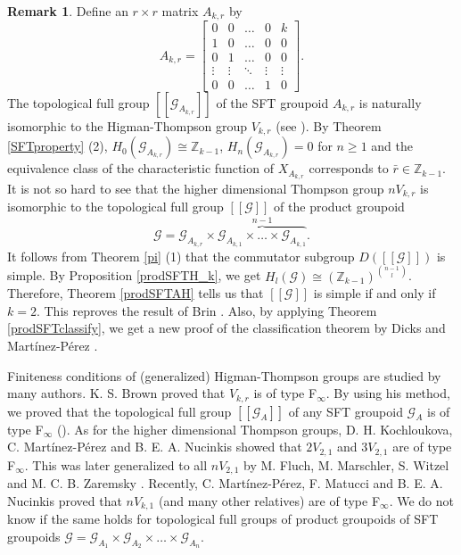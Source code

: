 \documentclass[11pt]{article}
\theoremstyle{definition}
\newtheorem{remark}[theorem]{Remark}
\numberwithin{equation}{section}
\newcommand{\G}{\mathcal{G}}
\newcommand{\Z}{\mathbb{Z}}
\begin{document}
\begin{remark}
Define an $r\times r$ matrix $A_{k,r}$ by 
\[
A_{k,r}=\begin{bmatrix}0&0&\ldots&0&k\\1&0&\ldots&0&0\\0&1&\ldots&0&0\\
\vdots&\vdots&\ddots&\vdots&\vdots\\0&0&\ldots&1&0\end{bmatrix}. 
\]
The topological full group $[[\G_{A_{k,r}}]]$ of the SFT groupoid $A_{k,r}$ 
is naturally isomorphic to the Higman-Thompson group $V_{k,r}$ 
(see \cite[Section 6.7.1]{M15crelle}). 
By Theorem \ref{SFTproperty} (2), 
$H_0(\G_{A_{k,r}})\cong\Z_{k{-}1}$, $H_n(\G_{A_{k,r}})=0$ for $n\geq1$ and 
the equivalence class of the characteristic function of $X_{A_{k,r}}$ 
corresponds to $\bar{r}\in\Z_{k{-}1}$. 
It is not so hard to see that 
the higher dimensional Thompson group $nV_{k,r}$ is isomorphic to 
the topological full group $[[\G]]$ of 
the product groupoid 
\[
\G=\G_{A_{k,r}}
\times\overbrace{\G_{A_{k,1}}\times\dots\times\G_{A_{k,1}}}^{n-1}. 
\]
It follows from Theorem \ref{pi} (1) that 
the commutator subgroup $D([[\G]])$ is simple. 
By Proposition \ref{prodSFTH_k}, 
we get $H_l(\G)\cong(\Z_{k{-}1})^{\binom{n{-}1}{l}}$. 
Therefore, Theorem \ref{prodSFTAH} tells us that 
$[[\G]]$ is simple if and only if $k=2$. 
This reproves the result of Brin \cite{Brin10PublMat}. 
Also, by applying Theorem \ref{prodSFTclassify}, 
we get a new proof of the classification theorem 
by Dicks and Mart\'inez-P\'erez \cite{DMP14Israel}. 

Finiteness conditions of (generalized) Higman-Thompson groups are studied 
by many authors. 
K. S. Brown \cite{Br87JPAA} proved that $V_{k,r}$ is of type F$_\infty$. 
By using his method, we proved that 
the topological full group $[[\G_A]]$ of any SFT groupoid $\G_A$ is 
of type F$_\infty$ (\cite[Theorem 6.21]{M15crelle}). 
As for the higher dimensional Thompson groups, 
D. H. Kochloukova, C. Mart\'inez-P\'erez and B. E. A. Nucinkis 
\cite{KMPN13ProcEdinb} 
showed that $2V_{2,1}$ and $3V_{2,1}$ are of type F$_\infty$. 
This was later generalized to all $nV_{2,1}$ 
by M. Fluch, M. Marschler, S. Witzel and M. C. B. Zaremsky \cite{FMWZ13PJM}. 
Recently, C. Mart\'inez-P\'erez, F. Matucci and B. E. A. Nucinkis 
\cite{MPMN13} 
proved that $nV_{k,1}$ (and many other relatives) are of type F$_\infty$. 
We do not know if the same holds for topological full groups 
of product groupoids of SFT groupoids 
$\G=\G_{A_1}\times\G_{A_2}\times\dots\times\G_{A_n}$. 
\end{remark}
\end{document}
